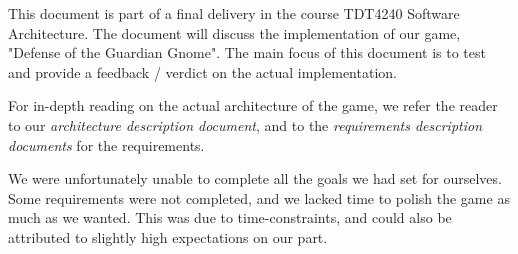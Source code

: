 This document is part of a final delivery in the course TDT4240 Software 
Architecture. The document will discuss the implementation of our game,
"Defense of the Guardian Gnome". The main focus of this document is to test
and provide a feedback / verdict on the actual implementation. 

For in-depth reading on the actual architecture of the game, we refer the
reader to our \emph{architecture description document}, and to the
\emph{requirements description documents} for the requirements. 

We were unfortunately unable to complete all the goals we had set for
ourselves. Some requirements were not completed, and we lacked time to
polish the game as much as we wanted. This was due to time-constraints,
and could also be attributed to slightly high expectations on our part.
